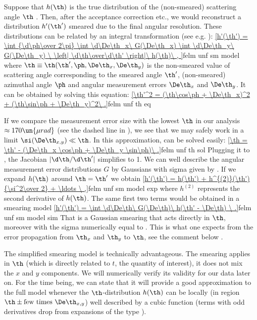 Suppose that $h(\th)$ is the true distribution of the (non-smeared) scattering angle $\th$
. Then, after the acceptance correction etc., we would reconstruct a distribution $h'(\th')$ smeared due to the final angular resolution. These distributions can be related by an integral transformation (see e.g. ):
\eqref{h'(\th') = \int {\d\ph\over 2\pi} \int \d\De\th_x\ G(\De\th_x) \int \d\De\th_y\ G(\De\th_y)
	\ \left| \d\th\over\d\th' \right|\ h(\th)\ ,
}{felm unf sm model}
where $\th \equiv \th(\th', \ph, \De\th_x, \De\th_y)$ is the non-smeared value of scattering angle corresponding to the smeared angle $\th'$, (non-smeared) azimuthal angle $\ph$ and angular measurement errors $\De\th_x$ and $\De\th_y$. It can be obtained by solving this equation:
\eqref{\th'^2 = (\th\cos\ph + \De\th_x)^2 + (\th\sin\ph + \De\th_y)^2\ .}{felm unf th eq}

If we compare the measurement error size  with the lowest $\th$ in our analysis $\approx 170\un{\mu rad}$ (see the dashed line in ), we see that we may safely work in a limit $\si(\De\th_{x, y}) \ll \th$. In this approximation,  can be solved easily:
\eqref{\th = \th' - (\De\th_x \cos\ph + \De\th_y \sin\ph)\ .}{felm unf th sol}
Plugging it to , the Jacobian $|\d\th/\d\th'|$ simplifies to 1. We can well describe the angular measurement error distributions $G$ by Gaussians with sigma given by . If we expand $h(\th)$ around $\th = \th'$ we obtain
\eqref{h'(\th') = h(\th') + h^{(2)}(\th') {\si^2\over 2} + \ldots \ ,}{felm unf sm model exp}
where $h^{(2)}$ represents the second derivative of $h(\th)$. The same first two terms would be obtained in a smearing model
\eqref{h'(\th') = \int \d\De\th\ G(\De\th)\ h(\th' - \De\th)  \ .}{felm unf sm model sim}
That is a Gaussian smearing that acts directly in $\th$, moreover with the sigma numerically equal to . This is what one expects from the error propagation from $\th_x$ and $\th_y$ to $\th$, see the comment below .

The simplified smearing model  is technically advantageous. The smearing applies in $\th$ (which is directly related to $t$, the quantity of interest), it does not mix the $x$ and $y$ components. We will numerically verify its validity for our data later on. For the time being, we can state that it will provide a good approximation to the full model  whenever the $\th$-distribution $h(\th)$ can be locally (in region $\th \pm \hbox{few times }\De\th_{x, y}$) well described by a cubic function (terms with odd derivatives drop from expansions of the type ).

